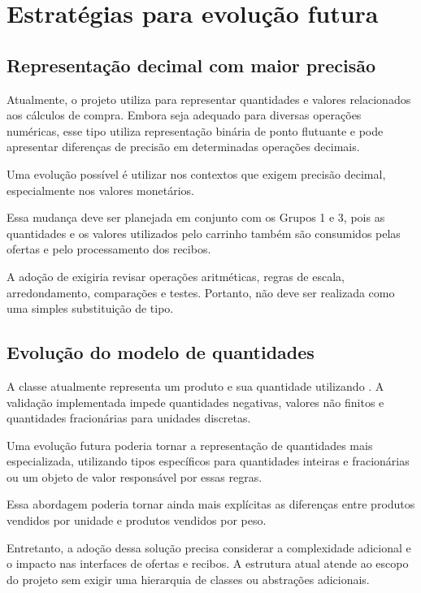 \section{Estratégias para evolução futura}

\subsection{Representação decimal com maior precisão}

Atualmente, o projeto utiliza  para representar quantidades e valores relacionados aos cálculos de compra. Embora seja adequado para diversas operações numéricas, esse tipo utiliza representação binária de ponto flutuante e pode apresentar diferenças de precisão em determinadas operações decimais.

Uma evolução possível é utilizar  nos contextos que exigem precisão decimal, especialmente nos valores monetários.

Essa mudança deve ser planejada em conjunto com os Grupos 1 e 3, pois as quantidades e os valores utilizados pelo carrinho também são consumidos pelas ofertas e pelo processamento dos recibos.

A adoção de  exigiria revisar operações aritméticas, regras de escala, arredondamento, comparações e testes. Portanto, não deve ser realizada como uma simples substituição de tipo.

\subsection{Evolução do modelo de quantidades}

A classe  atualmente representa um produto e sua quantidade utilizando . A validação implementada impede quantidades negativas, valores não finitos e quantidades fracionárias para unidades discretas.

Uma evolução futura poderia tornar a representação de quantidades mais especializada, utilizando tipos específicos para quantidades inteiras e fracionárias ou um objeto de valor responsável por essas regras.

Essa abordagem poderia tornar ainda mais explícitas as diferenças entre produtos vendidos por unidade e produtos vendidos por peso.

Entretanto, a adoção dessa solução precisa considerar a complexidade adicional e o impacto nas interfaces de ofertas e recibos. A estrutura atual atende ao escopo do projeto sem exigir uma hierarquia de classes ou abstrações adicionais.

